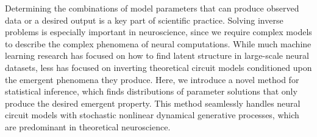 \documentclass[11pt]{article}
\DeclareMathOperator*{\argmax}{argmax}
\begin{document}


Determining the combinations of model parameters that can produce observed data or a desired output is a key part of scientific practice.
Solving inverse problems is especially important in neuroscience, since we require complex models to describe the complex phenomena of neural computations.
While much machine learning research has focused on how to find latent structure in large-scale neural datasets, less has focused on inverting theoretical circuit models conditioned upon the emergent phenomena they produce.
Here, we introduce a novel method for statistical inference, which finds distributions of parameter solutions that only produce the desired emergent property.
This method seamlessly handles neural circuit models with stochastic nonlinear dynamical generative processes, which are predominant in theoretical neuroscience.
\end{document}
